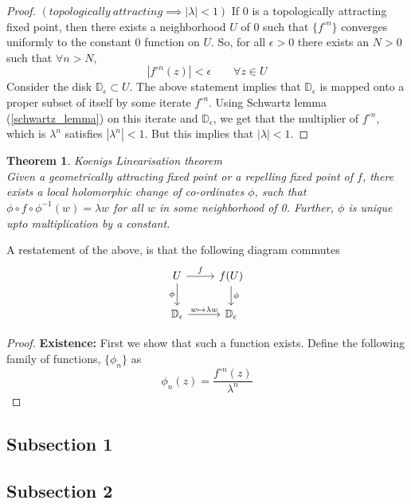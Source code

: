 \documentclass[reqno]{amsart}
\numberwithin{equation}{section}
\theoremstyle{plain}
\newtheorem{theorem}{Theorem}[section]
\theoremstyle{definition}
\theoremstyle{definition}
\begin{document}
\begin{proof}
        $(topologically \ attracting \implies |\lambda| < 1)$
        If $0$ is a topologically attracting fixed point, then there exists a neighborhood $U$ of $0$ such that $\{f^{\circ n}\}$ converges uniformly to the constant $0$ function on $U$. So, for all $\epsilon >0$ there exists an $N > 0$ such that $\forall n > N$,
        \[
            |f^{\circ n}(z)| < \epsilon \quad \quad \forall z \in U
        \]
        Consider the disk $\mathbb{D}_{\epsilon} \subset U$. The above statement implies that $\mathbb{D}_{\epsilon}$ is mapped onto a proper subset of itself by some iterate $f^{\circ n}$. Using Schwartz lemma (\ref{schwartz_lemma}) on this iterate and $\mathbb{D}_{\epsilon}$, we get that the multiplier of $f^{\circ n}$, which is $\lambda^n$ satisfies $|\lambda^n| < 1$. But this implies that $|\lambda|<1$.

    \end{proof}
    \begin{theorem}{Koenigs Linearisation theorem} \\
        Given a geometrically attracting fixed point or a repelling fixed point of $f$, there exists a local holomorphic change of co-ordinates $\phi$, such that $\phi \circ f \circ \phi^{-1}(w) = \lambda w$ for all $w$ in some neighborhood of 0. Further, $\phi$ is unique upto multiplication by a constant.
    \end{theorem}
    A restatement of the above, is that the following diagram commutes
    \[ 
    \begin{tikzcd}
        U \arrow{r}{f} \arrow[swap]{d}{\phi} & f(U) \arrow{d}{\phi} \\%
        \mathbb{D}_\epsilon \arrow{r}{w \mapsto \lambda w} & \mathbb{D}_\epsilon
    \end{tikzcd}
    \]
    \begin{proof}
        \textbf{Existence:} First we show that such a function exists. Define the following family of functions, $\{\phi_n\}$ as
        \[
            \phi_n(z) = \frac{f^{\circ n}(z)}{\lambda^n}  
        \]
    \end{proof}
    \subsection{Subsection 1}

    
    
    \subsection{Subsection 2} 
\end{document}
